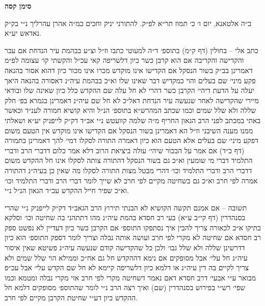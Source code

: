 \documentclass[12pt, openany]{book}
\newcommand{\chapname}{}
\newcommand{\newchap}[1]{
	\addcontentsline{toc}{chapter}{#1}
	\renewcommand{\chapname}{#1}
		\begin{center}
			\textbf{%
\fontsize{16pt}{16pt}\selectfont
				#1}
		\end{center}
}
\begin{document}
\newchap{סימן קסה}
\begin{multicols}{2}
ב״ה אלטאנא, יום ו׳ כ׳ תמוז תר״א לפ״ק. להתורני יניק וחכים כמ״ה אהרן עהרליך נ״י בק״ק נאדאש יע״א.\\\vspace{0pt}

כתב אלי – בחולין (דף ק״מ) בתוספ׳ ד״ה למעוטי כתבו וז״ל וצ״ע בבהמת עיר הנדחת אם עבר והקדישה והקריבה אם הוא קרבן כשר כיון דלשריפה קאי עכ״ל והקשתי קו׳ עצומה לפ״מ דאמרינן בב״ק בשור הנסקל אם הקדישו אינו מוקדש מכרו אינו מכור כיון דהוא אסור בהנאה פקע מיני׳ שם בעלים והוי כמקדיש דבר שאינו שלו וא״כ בבהמת עיה״נ דאסורה בהנאה היאך יעלה על הדעת דיהי׳ הקרבן כשר דהרי לא חל עלה שם ההקדש כלל כיון שאינה שלו ובודאי מיירי שהקדישה לאחר שנעשה עיר הנדחת דאל״כ לא חל שם עיה״נ דאמרינן בגמרא בפ׳ חלק שללה ולא שלל שמים וכמו שכתב המהרש״א בתוספ׳ הנ״ל והיא קושיא חמורה לענ״ד וכאשר באתי במכתב לפני הרב הגאון החריף מ״ה שלמה קוועטש נ״י אב״ד דק״ק לייפניק יע״א ושאלתי ממנו מענה השיבני וז״ל הא דאמרינן בשור הנסקל אם הקדישו אינו מוקדש אין הטעם משום דפקע מיני׳ שם בעלים אלא הטעם הוא כיון דאמרה התורה לסקלו דמי׳ להך דאמרינן בתמורה (דף כ״ד) אם אמר על הבכור שיהי׳ עולה ביציאת הרוב דלא אמר כלום דדברי הרב ודברי התלמיד דברי מי שומעין וא״כ גם בשור הנסקל דהתורה צותה לסקלו אינו חל ההקדש משום דדברי הרב ודברי התלמיד וכו׳ דהרי מבטל מצות התורה לסקלו מה שאין כן בעיה״נ דהתורה אמרה לפי חרב וא״כ גם בשחיטה מקיים לפי חרב לא שייך לומר דברי הרב ודברי התלמיד וכו׳ וא״כ שפיר חייל ההקדש עכ״ד הגאון הנ״ל נ״י.\\\vspace{0pt}

תשובה – אם אמנם תקשה הקושיא לא הבנתי תירוץ הרב הגאב״ד דק״ק לייפניק נ״י שהרי בסנהדרין (דף קי״ב ע״א) בעי רב חסדא בהמת עיה״נ מהו דתתהני בה שחיטה וכו׳ וסלקא בתיקו א״כ לכאורה צריך להבין איך נסתפקו התוספ׳ אם הקרבן כשר כיון דעדיין לא נפשט ספק רב חסדא אם שחיטה לא מקרי לפי חרב ועושה אותה נבלה וצריך לומר דספק התוספ׳ הוא כיון דדרשינן שללה ולא שלל גבו׳ ולכן כל שהקדישה קודם שנעשה עיה״נ פשיטא שאין איסור עיה״נ חל עלי׳ אבל מסופקים אם נימא דההקדש חל גם אח״כ וממילא הוי שלל שמים ולא צריך לקיים בה דין עיה״נ או דלמא כיון דלשריפה קיימא לא חל שם הקדש עלי׳ אבל עכ״פ מבואר ע״י אבעי׳ דרב חסדא דאם נאמר דשחיטה מקרי לפי חרב אזי מקרי נבלה ומטמא וכמו שפי׳ רש״י בפירוש בסנהדרין (שם) ואיך רצה הרב נ״י לומר שהתוספ׳ מסופקים דלמא חל ההקדש כיון דע״י שחיטת הקרבן מקיים לפי חרב.\\\vspace{0pt}


\end{multicols}
\end{document}
